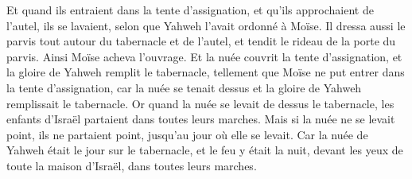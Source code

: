 \begin{multicols}{2}
Et quand ils entraient dans la tente d'assignation, et qu'ils approchaient de l'autel, ils se lavaient, selon que Yahweh l'avait ordonné à Moïse.
Il dressa aussi le parvis tout autour du tabernacle et de l'autel, et tendit le rideau de la porte du parvis. Ainsi Moïse acheva l'ouvrage.
Et la nuée couvrit la tente d'assignation, et la gloire de Yahweh remplit le tabernacle,
tellement que Moïse ne put entrer dans la tente d'assignation, car la nuée se tenait dessus et la gloire de Yahweh remplissait le tabernacle.
 Or quand la nuée se levait de dessus le tabernacle, les enfants d'Israël partaient dans toutes leurs marches.
Mais si la nuée ne se levait point, ils ne partaient point, jusqu'au jour où elle se levait.
Car la nuée de Yahweh était le jour sur le tabernacle, et le feu y était la nuit, devant les yeux de toute la maison d'Israël, dans toutes leurs marches.
\PPE
\end{multicols}
